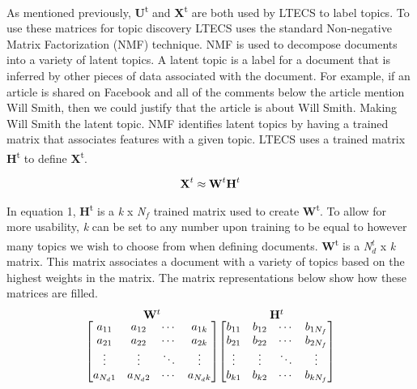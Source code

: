 \documentclass{sig-alternate}
\begin{document}
As mentioned previously, \textbf{U}\textsuperscript{t} and \textbf{X}\textsuperscript{t} are both used by LTECS to label topics. 
To use these matrices for topic discovery LTECS uses the standard Non-negative Matrix Factorization (NMF) technique. 
NMF is used to decompose documents into a variety of latent topics. 
A latent topic is a label for a document that is inferred by other pieces of data associated with the document. 
For example, if an article is shared on Facebook and all of the comments below the article mention Will Smith, then we could justify that the article is about Will Smith. 
Making Will Smith the latent topic. 
NMF identifies latent topics by having a trained matrix that associates features with a given topic. 
LTECS uses a trained matrix \textbf{H}\textsuperscript{t} to define \textbf{X}\textsuperscript{t}.

\begin{equation}
	\textrm{\textbf{X}}^t\approx \textrm{\textbf{W}}^t\textrm{\textbf{H}}^t 
\label{eq:featuresMatix}
\end{equation}

In equation 1, \textbf{H}\textsuperscript{t} is a \textit{k} x \textit{N}$_f$ trained matrix used to create \textbf{W}\textsuperscript{t}. 
To allow for more usability, \textit{k} can be set to any number upon training to be equal to however many topics we wish to choose from when defining documents. 
\textbf{W}\textsuperscript{t} is a \textit{N}$_d^t$ x \textit{k} matrix. 
This matrix associates a document with a variety of topics based on the highest weights in the matrix.
The matrix representations below show how these matrices are filled.
\[
  \stackrel{\mbox{\textbf{W}$^t$}}{%
    \begin{bmatrix}
    a_{11} & a_{12} & \cdots & a_{1k} \\
    a_{21} & a_{22} & \cdots & a_{2k} \\
    \vdots & \vdots & \ddots & \vdots \\
    a_{N_d1} & a_{N_d2} & \cdots & a_{N_dk}
    \end{bmatrix}%
  }
  \stackrel{\mbox{\textbf{H}$^t$}}{%
    \begin{bmatrix}
    b_{11} & b_{12} & \cdots & b_{1N_f} \\
    b_{21} & b_{22} & \cdots & b_{2N_f} \\
    \vdots & \vdots & \ddots & \vdots \\
    b_{k1} & b_{k2} & \cdots & b_{kN_f}
    \end{bmatrix}%
  }
\]
\end{document}
